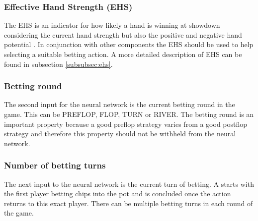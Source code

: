 \subsubsection{Effective Hand Strength (EHS)}
The EHS is an indicator for how likely a hand is winning at showdown considering the current hand strength but also the positive and negative hand potential \cite{evolutionary_methods}. In conjunction with other components the EHS should be used to help selecting a suitable betting action. A more detailed description of EHS can be found in subsection \ref{subsubsec:ehs}.
\subsubsection{Betting round}
The second input for the neural network is the current betting round in the game. This can be PREFLOP, FLOP, TURN or RIVER. The betting round is an important property because a good preflop strategy varies from a good postflop strategy and therefore this property should not be withheld from the neural network.
\subsubsection{Number of betting turns}
The next input to the neural network is the current turn of betting. A  starts with the first player betting chips into the pot and is concluded once the action returns to this exact player. There can be multiple betting turns in each round of the game. 
